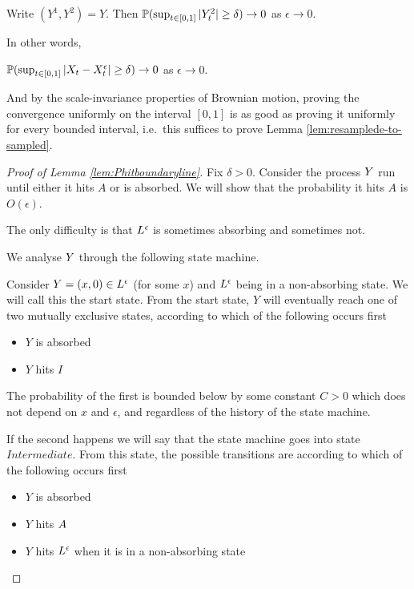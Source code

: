 {\begin{lemma}
  Write $(Y^1, Y^2) = Y$.  Then $\P(\sup_{t \in [0,1]} |Y^2_t| \ge
  \delta) \to 0$ as $\epsilon \to 0$.
\end{lemma}

In other words,

\begin{cor}
  $\P(\sup_{t \in [0,1]} |\sampled_t - \resamplede_t | \ge \delta) \to
  0$ as $\epsilon \to 0$.
\end{cor}

And by the scale-invariance properties of Brownian motion, proving the
convergence uniformly on the interval $[0,1]$ is as good as proving it
uniformly for every bounded interval, i.e.\ this suffices to prove
Lemma \ref{lem:resamplede-to-sampled}\label{proof-of-lem:resamplede-to-sampled}.

\begin{proof}[Proof of Lemma \ref{lem:Phitboundaryline}]
Fix $\delta > 0$.  Consider the process $\rotproc$ run until either
it hits $A$ or is absorbed.  We will show that the probability it
hits $A$ is $O(\epsilon)$.

The only difficulty is that $\Le$ is sometimes absorbing and
sometimes not.

We analyse $\rotproc$ through the following state machine.

Consider $\rotproc = (x,0) \in \Le$ (for some $x$) and $\Le$ being in
a non-absorbing state.  We will call this the start state.  From the
start state, $Y$ will eventually reach one of two mutually exclusive
states, according to which of the following occurs first

\newcommand{\intermediatelines}{I}

\begin{itemize}
\item $Y$ is absorbed
\item $Y$ hits $\intermediatelines$
\end{itemize}

The probability of the first is bounded below by some constant $C > 0$
which does not depend on $x$ and $\epsilon$, and regardless of the
history of the state machine.

\newcommand{\stateintermediate}{Intermediate}

If the second happens we will say that the state machine goes into
state $\stateintermediate$.  From this state, the possible transitions
are according to which of the following occurs first

\begin{itemize}
\item $Y$ is absorbed
\item $Y$ hits $\boundarylines$
\item $Y$ hits $\Le$ when it is in a non-absorbing state
\end{itemize}


\end{proof}}
